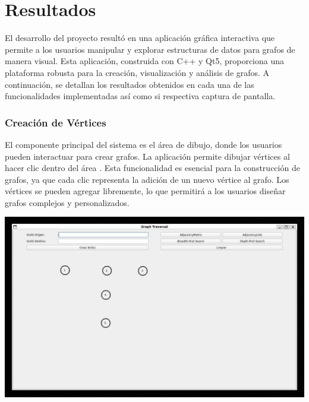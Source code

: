 \documentclass[conference]{IEEEtran}
\begin{document}
\section{Resultados}

El desarrollo del proyecto resultó en una aplicación gráfica interactiva que permite a los usuarios manipular y explorar estructuras de datos para grafos de manera visual. Esta aplicación, construida con C++ y Qt5, proporciona una plataforma robusta para la creación, visualización y análisis de grafos. A continuación, se detallan los resultados obtenidos en cada una de las funcionalidades implementadas así como si respectiva captura de pantalla.




\subsubsection{\textbf{Creación de Vértices}}
El componente principal del sistema es el área de dibujo, donde los usuarios pueden interactuar para crear grafos. La aplicación permite dibujar vértices al hacer clic dentro del área . Esta funcionalidad es esencial para la construcción de grafos, ya que cada clic representa la adición de un nuevo vértice al grafo. Los vértices se pueden agregar libremente, lo que permitirá a los usuarios diseñar grafos complejos y personalizados.
\begin{center}
    \includegraphics[width=\linewidth]{img/Vertices.png}
\end{center}
\end{document}
